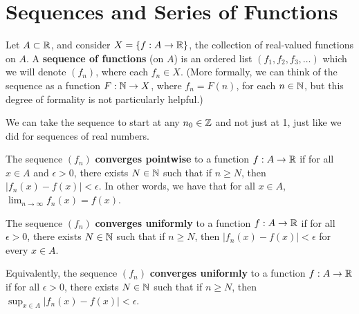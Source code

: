 \documentclass[../main.tex]{subfiles}
\begin{document}
\chapter{Sequences and Series of Functions}\label{sct:17}
\begin{definition}\label{dfn:17.1}
    Let $A\subset\mathbb{R}$, and consider $X=\{f:A\to\mathbb{R}\}$, the collection of real-valued functions on $A$. A \textbf{sequence of functions} (on $A$) is an ordered list $(f_1,f_2,f_3,\dots)$ which we will denote $(f_n)$, where each $f_n\in X$. (More formally, we can think of the sequence as a function $F:\mathbb{N}\to X$, where $f_n=F(n)$, for each $n\in\mathbb{N}$, but this degree of formality is not particularly helpful.)\par
    We can take the sequence to start at any $n_0\in\mathbb{Z}$ and not just at 1, just like we did for sequences of real numbers.
\end{definition}

\begin{definition}\label{dfn:17.2}
    The sequence $(f_n)$ \textbf{converges pointwise} to a function $f:A\to\mathbb{R}$ if for all $x\in A$ and $\epsilon>0$, there exists $N\in\mathbb{N}$ such that if $n\geq N$, then $|f_n(x)-f(x)|<\epsilon$. In other words, we have that for all $x\in A$, $\lim_{n\to\infty}f_n(x)=f(x)$.
\end{definition}

\begin{definition}\label{dfn:17.3}
    The sequence $(f_n)$ \textbf{converges uniformly} to a function $f:A\to\mathbb{R}$ if for all $\epsilon>0$, there exists $N\in\mathbb{N}$ such that if $n\geq N$, then $|f_n(x)-f(x)|<\epsilon$ for every $x\in A$.\par
    Equivalently, the sequence $(f_n)$ \textbf{converges uniformly} to a function $f:A\to\mathbb{R}$ if for all $\epsilon>0$, there exists $N\in\mathbb{N}$ such that if $n\geq N$, then $\sup_{x\in A}|f_n(x)-f(x)|<\epsilon$.
\end{definition}
\end{document}

